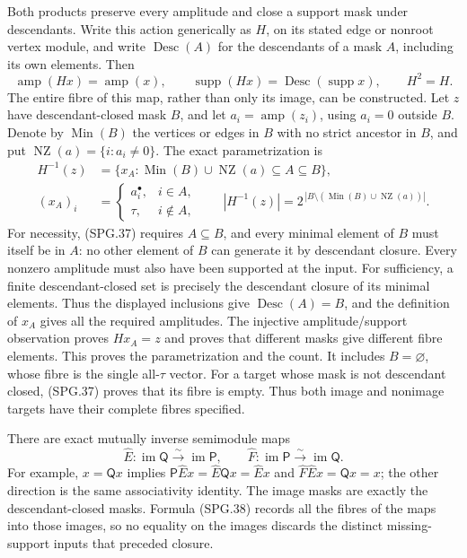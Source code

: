 Both products preserve every amplitude and close a support mask under
descendants. Write this action generically as \(H\), on its stated
edge or nonroot vertex module, and write
\(\operatorname{Desc}(A)\) for the descendants of a mask \(A\),
including its own elements. Then
\[
 \operatorname{amp}(Hx)=\operatorname{amp}(x),\qquad
 \operatorname{supp}(Hx)=\operatorname{Desc}(\operatorname{supp}x),
 \qquad H^2=H.
 \tag{SPG.37}\label{eq:spg-mask-closure}
\]
The entire fibre of this map, rather than only its image, can be
constructed. Let \(z\) have descendant-closed mask \(B\), and
let \(a_i=\operatorname{amp}(z_i)\), using \(a_i=0\) outside
\(B\). Denote by \(\operatorname{Min}(B)\) the vertices or edges
in \(B\) with no strict ancestor in \(B\), and put
\(\operatorname{NZ}(a)=\{i:a_i\ne0\}\). The exact parametrization
is
\[
 \begin{split}
 H^{-1}(z)&=\{x_A:
       \operatorname{Min}(B)\cup\operatorname{NZ}(a)
                                  \subseteq A\subseteq B\},\\
 (x_A)_i&=
   \begin{cases}a_i^\bullet,&i\in A,\\ \tau,&i\notin A,\end{cases}
 \qquad
 |H^{-1}(z)|=2^{\,|B\setminus
       (\operatorname{Min}(B)\cup\operatorname{NZ}(a))|}.
 \end{split}
 \tag{SPG.38}\label{eq:spg-full-fibre}
\]
For necessity, (SPG.37) requires \(A\subseteq B\), and every
minimal element of \(B\) must itself be in \(A\): no other
element of \(B\) can generate it by descendant closure.
Every nonzero amplitude must also have been supported at the input.
For sufficiency, a finite descendant-closed set is precisely the
descendant closure of its minimal elements. Thus the displayed
inclusions give \(\operatorname{Desc}(A)=B\), and the definition
of \(x_A\) gives all the required amplitudes. The injective
amplitude/support observation proves \(Hx_A=z\) and proves that
different masks give different fibre elements. This proves the
parametrization and the count. It includes \(B=\varnothing\),
whose fibre is the single all-\(\tau\) vector.
For a target whose mask is not descendant closed, (SPG.37) proves
that its fibre is empty. Thus both image and nonimage targets have
their complete fibres specified.

There are exact mutually inverse semimodule maps
\[
 \widehat E:\operatorname{im}\mathsf Q
                     \xrightarrow{\sim}\operatorname{im}\mathsf P,
 \qquad
 \widehat F:\operatorname{im}\mathsf P
                     \xrightarrow{\sim}\operatorname{im}\mathsf Q.
 \tag{SPG.39}\label{eq:spg-retract-isomorphism}
\]
For example, \(x=\mathsf Qx\) implies
\(\mathsf P\widehat Ex=\widehat E\mathsf Qx=\widehat Ex\)
and \(\widehat F\widehat Ex=\mathsf Qx=x\); the other direction
is the same associativity identity. The image masks are exactly the
descendant-closed masks. Formula (SPG.38) records all the fibres of
the maps into those images, so no equality on the images discards
the distinct missing-support inputs that preceded closure.

